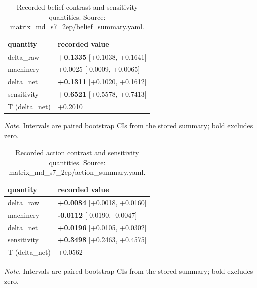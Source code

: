 \documentclass[10pt]{article}
\begin{document}
\begin{table}[!t]
\centering
\footnotesize
\caption{ Recorded belief contrast and sensitivity quantities. Source: matrix\_md\_s7\_2ep/belief\_summary.yaml. }

\begin{tabular}{ ll }
\toprule
quantity & recorded value \\
\midrule

delta\_raw & \textbf{+0.1335} [+0.1038, +0.1641] \\

machinery & +0.0025 [-0.0009, +0.0065] \\

delta\_net & \textbf{+0.1311} [+0.1020, +0.1612] \\

sensitivity & \textbf{+0.6521} [+0.5578, +0.7413] \\

T (delta\_net) & +0.2010 \\

\bottomrule
\end{tabular}

\par\footnotesize\emph{Note.} Intervals are paired bootstrap CIs from the stored summary; bold excludes zero.
\end{table}


\begin{table}[!t]
\centering
\footnotesize
\caption{ Recorded action contrast and sensitivity quantities. Source: matrix\_md\_s7\_2ep/action\_summary.yaml. }

\begin{tabular}{ ll }
\toprule
quantity & recorded value \\
\midrule

delta\_raw & \textbf{+0.0084} [+0.0018, +0.0160] \\

machinery & \textbf{-0.0112} [-0.0190, -0.0047] \\

delta\_net & \textbf{+0.0196} [+0.0105, +0.0302] \\

sensitivity & \textbf{+0.3498} [+0.2463, +0.4575] \\

T (delta\_net) & +0.0562 \\

\bottomrule
\end{tabular}

\par\footnotesize\emph{Note.} Intervals are paired bootstrap CIs from the stored summary; bold excludes zero.
\end{table}
\end{document}
